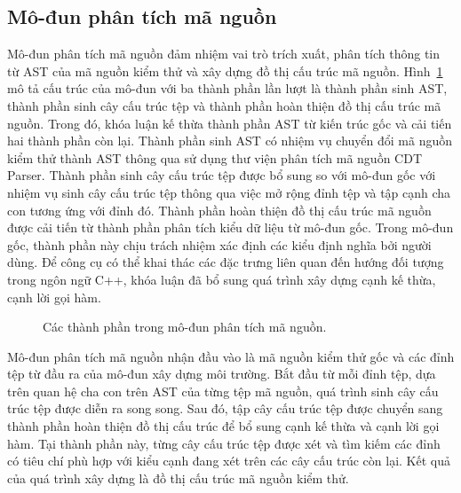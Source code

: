 \subsection{Mô-đun phân tích mã nguồn}\label{sec:module-analyze}
Mô-đun phân tích mã nguồn đảm nhiệm vai trò trích xuất, phân tích thông tin từ AST của mã nguồn kiểm thử và xây dựng đồ thị cấu trúc mã nguồn. Hình~\ref{fig:module-analyze} mô tả cấu trúc của mô-đun với ba thành phần lần lượt là thành phần sinh AST, thành phần sinh cây cấu trúc tệp và thành phần hoàn thiện đồ thị cấu trúc mã nguồn. Trong đó, khóa luận kế thừa thành phần AST từ kiến trúc gốc và cải tiến hai thành phần còn lại. Thành phần sinh AST có nhiệm vụ chuyển đổi mã nguồn kiểm thử thành AST thông qua sử dụng thư viện phân tích mã nguồn CDT Parser.  Thành phần sinh cây cấu trúc tệp được bổ sung so với mô-đun gốc với nhiệm vụ sinh cây cấu trúc tệp thông qua việc mở rộng đỉnh tệp và tập cạnh cha con tương ứng với đỉnh đó. Thành phần hoàn thiện đồ thị cấu trúc mã nguồn được cải tiến từ thành phần phân tích kiểu dữ liệu từ mô-đun gốc. Trong mô-đun gốc, thành phần này chịu trách nhiệm xác định các kiểu định nghĩa bởi người dùng. Để công cụ có thể khai thác các đặc trưng liên quan đến hướng đối tượng trong ngôn ngữ C++, khóa luận đã bổ sung quá trình xây dựng cạnh kế thừa, cạnh lời gọi hàm.

\begin{figure}[h]
    \centering
    
    \caption{Các thành phần trong mô-đun phân tích mã nguồn.}
    \label{fig:module-analyze}
\end{figure}

Mô-đun phân tích mã nguồn nhận đầu vào là mã nguồn kiểm thử gốc và các đỉnh tệp từ đầu ra của mô-đun xây dựng môi trường. Bắt đầu từ mỗi đỉnh tệp, dựa trên quan hệ cha con trên AST của từng tệp mã nguồn, quá trình sinh cây cấu trúc tệp được diễn ra song song. Sau đó, tập cây cấu trúc tệp được chuyển sang thành phần hoàn thiện đồ thị cấu trúc để bổ sung cạnh kế thừa và cạnh lời gọi hàm. Tại thành phần này, từng cây cấu trúc tệp được xét và tìm kiếm các đỉnh có tiêu chí phù hợp với kiểu cạnh đang xét trên các cây cấu trúc còn lại. Kết quả của quá trình xây dựng là đồ thị cấu trúc mã nguồn kiểm thử.
